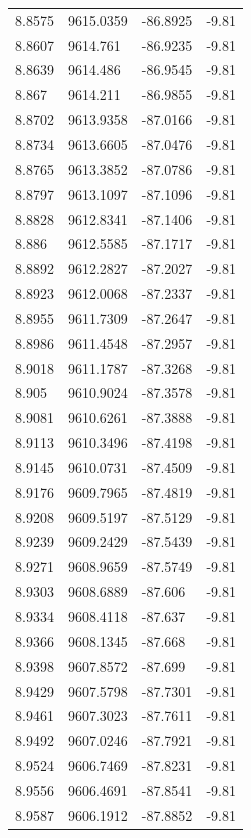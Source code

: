 \begin{table}[H]
\begin{tabular}{llll}
8.8575 & 9615.0359 & -86.8925 & -9.81 \\
8.8607 & 9614.761 & -86.9235 & -9.81 \\
8.8639 & 9614.486 & -86.9545 & -9.81 \\
8.867 & 9614.211 & -86.9855 & -9.81 \\
8.8702 & 9613.9358 & -87.0166 & -9.81 \\
8.8734 & 9613.6605 & -87.0476 & -9.81 \\
8.8765 & 9613.3852 & -87.0786 & -9.81 \\
8.8797 & 9613.1097 & -87.1096 & -9.81 \\
8.8828 & 9612.8341 & -87.1406 & -9.81 \\
8.886 & 9612.5585 & -87.1717 & -9.81 \\
8.8892 & 9612.2827 & -87.2027 & -9.81 \\
8.8923 & 9612.0068 & -87.2337 & -9.81 \\
8.8955 & 9611.7309 & -87.2647 & -9.81 \\
8.8986 & 9611.4548 & -87.2957 & -9.81 \\
8.9018 & 9611.1787 & -87.3268 & -9.81 \\
8.905 & 9610.9024 & -87.3578 & -9.81 \\
8.9081 & 9610.6261 & -87.3888 & -9.81 \\
8.9113 & 9610.3496 & -87.4198 & -9.81 \\
8.9145 & 9610.0731 & -87.4509 & -9.81 \\
8.9176 & 9609.7965 & -87.4819 & -9.81 \\
8.9208 & 9609.5197 & -87.5129 & -9.81 \\
8.9239 & 9609.2429 & -87.5439 & -9.81 \\
8.9271 & 9608.9659 & -87.5749 & -9.81 \\
8.9303 & 9608.6889 & -87.606 & -9.81 \\
8.9334 & 9608.4118 & -87.637 & -9.81 \\
8.9366 & 9608.1345 & -87.668 & -9.81 \\
8.9398 & 9607.8572 & -87.699 & -9.81 \\
8.9429 & 9607.5798 & -87.7301 & -9.81 \\
8.9461 & 9607.3023 & -87.7611 & -9.81 \\
8.9492 & 9607.0246 & -87.7921 & -9.81 \\
8.9524 & 9606.7469 & -87.8231 & -9.81 \\
8.9556 & 9606.4691 & -87.8541 & -9.81 \\
8.9587 & 9606.1912 & -87.8852 & -9.81 \\

\end{tabular}
\end{table}
